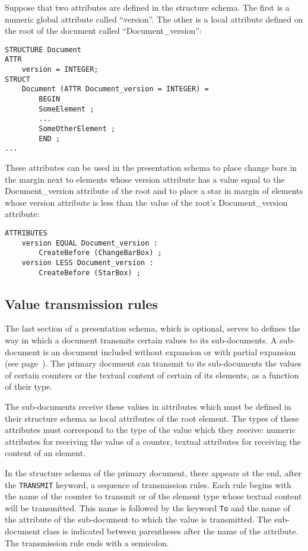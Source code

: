 \begin{example}
Suppose that two attributes are defined in the structure schema.  The
first is a numeric global attribute called ``version''.  The other is
a local attribute defined on the root of the document called
``Document\_version'':

\begin{verbatim}
STRUCTURE Document
ATTR
    version = INTEGER;
STRUCT
    Document (ATTR Document_version = INTEGER) =
        BEGIN
        SomeElement ;
        ...
        SomeOtherElement ;
        END ;
...
\end{verbatim}
These attributes can be used in the presentation schema to place
change bars in the margin next to elements whose version attribute
has a value equal to the Document\_version attribute of the root and
to place a star in margin of elements whose version attribute is less
than the value of the root's Document\_version attribute:
\begin{verbatim}
ATTRIBUTES
    version EQUAL Document_version :
        CreateBefore (ChangeBarBox) ;
    version LESS Document_version :
        CreateBefore (StarBox) ;
\end{verbatim}
\end{example}

\subsection{Value transmission rules}

The last section of a presentation schema, which is optional, serves
to defines the way in which a document transmits certain values to its
sub-documents.  A sub-document is an document included without
expansion or with partial expansion (see page~\pageref{inclusion}).
The primary document can transmit to its sub-documents the values of
certain counters or the textual content of certain of its elements, as
a function of their type.

The sub-documents receive these values in attributes which must be
defined in their structure schema as local attributes of the root
element.  The types of these attributes must correspond to the type of
the value which they receive:  numeric attributes for receiving the
value of a counter, textual attributes for receiving the content of
an element.

In the structure schema of the primary document, there appears at the
end, after the {\tt TRANSMIT} keyword, a sequence of transmission
rules.  Each rule begins with the name of the counter to transmit or of the
element type whose textual content will be transmitted.  This name is
followed by the keyword {\tt To} and the name of the attribute of the
sub-document to which the value is transmitted.  The sub-document class
is indicated between parentheses after the name of the attribute.  The
transmission rule ends with a semicolon.


